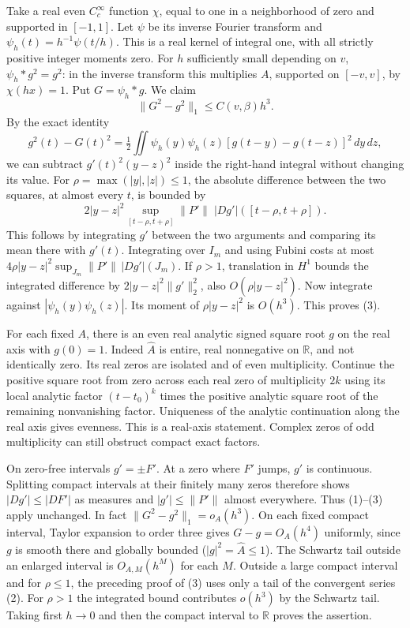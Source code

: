 \documentclass[11pt]{article}
\begin{document}
Take a real even \(C^\infty_c\) function \(\chi\), equal to one in a neighborhood of zero and supported in \([-1,1]\). Let \(\psi\) be its inverse Fourier transform and \(\psi_h(t)=h^{-1}\psi(t/h)\). This is a real kernel of integral one, with all strictly positive integer moments zero. For \(h\) sufficiently small depending on \(v\), \(\psi_h*g^2=g^2\): in the inverse transform this multiplies \(A\), supported on \([-v,v]\), by \(\chi(hx)=1\). Put \(G=\psi_h*g\). We claim
\[
                         \|G^2-g^2\|_1\le C(v,\beta)h^3 .          \tag{3}
\]
By the exact identity
\[
 g^2(t)-G(t)^2=\tfrac12\iint\psi_h(y)\psi_h(z)
                       [g(t-y)-g(t-z)]^2\,dy\,dz,
\]
we can subtract \(g'(t)^2(y-z)^2\) inside the right-hand integral without changing its value. For \(\rho=\max(|y|,|z|)\le1\), the absolute difference between the two squares, at almost every \(t\), is bounded by
\[
 2|y-z|^2\sup_{[t-\rho,t+\rho]}\|P'\|\;|Dg'|([t-\rho,t+\rho]).
\]
This follows by integrating \(g'\) between the two arguments and comparing its mean there with \(g'(t)\). Integrating over \(I_m\) and using Fubini costs at most \(4\rho |y-z|^2 \sup_{J_m}\|P'\|\, |Dg'|(J_m)\). If \(\rho>1\), translation in \(H^1\) bounds the integrated difference by \(2|y-z|^2\|g'\|_2^2\), also \(O(\rho |y-z|^2)\). Now integrate against \(|\psi_h(y)\psi_h(z)|\). Its moment of \(\rho |y-z|^2\) is \(O(h^3)\). This proves (3).

For each fixed \(A\), there is an even real analytic signed square root \(g\) on the real axis with \(g(0)=1\). Indeed \(\widehat A\) is entire, real nonnegative on \(\mathbb R\), and not identically zero. Its real zeros are isolated and of even multiplicity. Continue the positive square root from zero across each real zero of multiplicity \(2k\) using its local analytic factor \((t-t_0)^k\) times the positive analytic square root of the remaining nonvanishing factor. Uniqueness of the analytic continuation along the real axis gives evenness. This is a real-axis statement. Complex zeros of odd multiplicity can still obstruct compact exact factors.

On zero-free intervals \(g'=\pm F'\). At a zero where \(F'\) jumps, \(g'\) is continuous. Splitting compact intervals at their finitely many zeros therefore shows \(|Dg'|\le |DF'|\) as measures and \(|g'|\le\|P'\|\) almost everywhere. Thus (1)--(3) apply unchanged. In fact \(\|G^2-g^2\|_1=o_A(h^3)\). On each fixed compact interval, Taylor expansion to order three gives \(G-g=O_A(h^4)\) uniformly, since \(g\) is smooth there and globally bounded (\(|g|^2=\widehat A\le1\)). The Schwartz tail outside an enlarged interval is \(O_{A,M}(h^M)\) for each \(M\). Outside a large compact interval and for \(\rho\le1\), the preceding proof of (3) uses only a tail of the convergent series (2). For \(\rho>1\) the integrated bound contributes \(o(h^3)\) by the Schwartz tail. Taking first \(h\to0\) and then the compact interval to \(\mathbb R\) proves the assertion.
\end{document}

